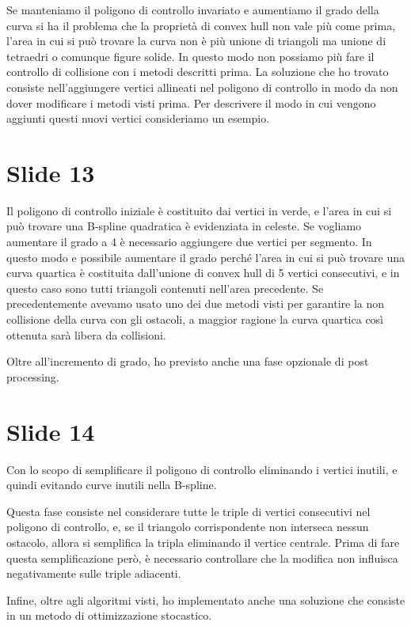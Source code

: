 \documentclass{article}
\begin{document}
Se manteniamo il poligono di controllo invariato e aumentiamo il grado
della curva si ha il problema che la proprietà di convex hull non vale
più come prima, l'area in cui si può trovare la curva non è più unione
di triangoli ma unione di tetraedri o comunque figure solide. In
questo modo non possiamo più fare il controllo di collisione con i
metodi descritti prima. La soluzione che ho trovato consiste
nell'aggiungere vertici allineati nel poligono di controllo in modo da
non dover modificare i metodi visti prima. Per descrivere il modo in
cui vengono aggiunti questi nuovi vertici consideriamo un esempio.

\section*{Slide 13}
Il poligono di controllo iniziale è costituito dai vertici in verde, e
l'area in cui si può trovare una B-spline quadratica è evidenziata in
celeste. Se vogliamo aumentare il grado a 4 è necessario aggiungere
due vertici per segmento. In questo modo e possibile aumentare il
grado perché l'area in cui si può trovare una curva quartica è
costituita dall'unione di convex hull di 5 vertici consecutivi, e in
questo caso sono tutti triangoli contenuti nell'area precedente. Se
precedentemente avevamo usato uno dei due metodi visti per garantire la non
collisione della curva con gli ostacoli, a maggior ragione la curva
quartica così ottenuta sarà libera da collisioni.

Oltre all'incremento di grado, ho previsto anche una fase opzionale di
post processing.

\section*{Slide 14}
Con lo scopo di semplificare il poligono di controllo eliminando i
vertici inutili, e quindi evitando curve inutili nella B-spline.

Questa fase consiste nel considerare tutte le triple di vertici
consecutivi nel poligono di controllo, e, se il triangolo
corrispondente non interseca nessun ostacolo, allora si semplifica la
tripla eliminando il vertice centrale. Prima di fare questa
semplificazione però, è necessario controllare che la modifica non
influisca negativamente sulle triple adiacenti.

Infine, oltre agli algoritmi visti, ho implementato anche una
soluzione che consiste in un metodo di ottimizzazione stocastico.
\end{document}
